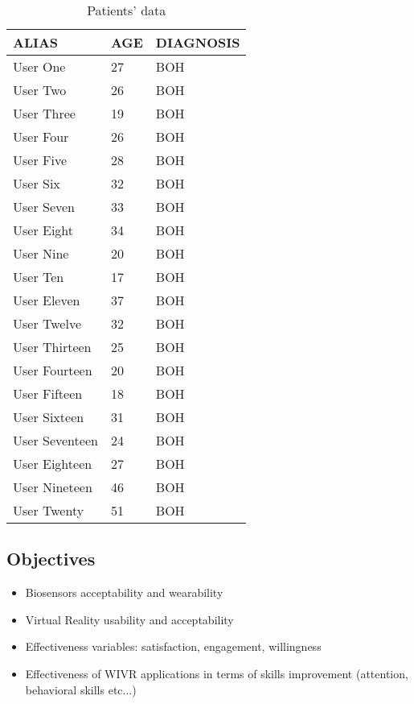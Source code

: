 \begin{table}[H]
\centering
\tabulinesep=1.2mm
\begin{tabu} {|B|A|C|}
\hline
       \textbf{ALIAS} & \textbf{AGE} & \textbf{DIAGNOSIS}\\\hline
       User One & 27 & BOH\\\hline
       User Two & 26 & BOH\\\hline
     User Three & 19 & BOH\\\hline
     User Four & 26 & BOH\\\hline
     User Five & 28 & BOH\\\hline
     User Six & 32 & BOH\\\hline
     User Seven & 33 & BOH\\\hline
     User Eight & 34 & BOH\\\hline
     User Nine & 20 & BOH\\\hline
     User Ten & 17 & BOH\\\hline
     User Eleven & 37 & BOH\\\hline
     User Twelve & 32 & BOH\\\hline
     User Thirteen & 25 & BOH\\\hline
     User Fourteen & 20 & BOH\\\hline
     User Fifteen & 18 & BOH\\\hline
     User Sixteen & 31 & BOH\\\hline
     User Seventeen & 24 & BOH\\\hline
     User Eighteen & 27 & BOH\\\hline
     User Nineteen & 46 & BOH\\\hline
     User Twenty & 51 & BOH\\\hline    
 \end{tabu}
 \caption{Patients' data \label{table:datap}}
\end{table}
\subsection{Objectives}
\begin{itemize}
\item Biosensors acceptability and wearability
\item Virtual Reality usability and acceptability
\item Effectiveness variables: satisfaction, engagement, willingness
\item Effectiveness of WIVR applications in terms of skills improvement (attention, behavioral skills etc...)
\end{itemize}	
